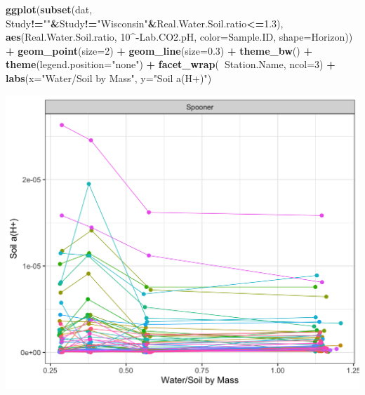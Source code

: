 \documentclass[]{article}
\newenvironment{Shaded}{\begin{snugshade}}{\end{snugshade}}
\newcommand{\DataTypeTok}[1]{\textcolor[rgb]{0.13,0.29,0.53}{#1}}
\newcommand{\DecValTok}[1]{\textcolor[rgb]{0.00,0.00,0.81}{#1}}
\newcommand{\FloatTok}[1]{\textcolor[rgb]{0.00,0.00,0.81}{#1}}
\newcommand{\KeywordTok}[1]{\textcolor[rgb]{0.13,0.29,0.53}{\textbf{#1}}}
\newcommand{\NormalTok}[1]{#1}
\newcommand{\OperatorTok}[1]{\textcolor[rgb]{0.81,0.36,0.00}{\textbf{#1}}}
\newcommand{\StringTok}[1]{\textcolor[rgb]{0.31,0.60,0.02}{#1}}
\begin{document}
\begin{Shaded}
\begin{Highlighting}[]
\KeywordTok{ggplot}\NormalTok{(}\KeywordTok{subset}\NormalTok{(dat, Study}\OperatorTok{!=}\StringTok{""}\OperatorTok{&}\NormalTok{Study}\OperatorTok{!=}\StringTok{"Wisconsin"}\OperatorTok{&}\NormalTok{Real.Water.Soil.ratio}\OperatorTok{<=}\FloatTok{1.3}\NormalTok{), }\KeywordTok{aes}\NormalTok{(Real.Water.Soil.ratio, }\DecValTok{10}\OperatorTok{^-}\NormalTok{Lab.CO2.pH, }\DataTypeTok{color=}\NormalTok{Sample.ID, }\DataTypeTok{shape=}\NormalTok{Horizon)) }\OperatorTok{+}\StringTok{ }
\StringTok{  }\KeywordTok{geom_point}\NormalTok{(}\DataTypeTok{size=}\DecValTok{2}\NormalTok{) }\OperatorTok{+}\StringTok{ }\KeywordTok{geom_line}\NormalTok{(}\DataTypeTok{size=}\FloatTok{0.3}\NormalTok{) }\OperatorTok{+}\StringTok{ }\KeywordTok{theme_bw}\NormalTok{() }\OperatorTok{+}\StringTok{ }\KeywordTok{theme}\NormalTok{(}\DataTypeTok{legend.position=}\StringTok{"none"}\NormalTok{) }\OperatorTok{+}
\StringTok{  }\KeywordTok{facet_wrap}\NormalTok{(}\OperatorTok{~}\NormalTok{Station.Name, }\DataTypeTok{ncol=}\DecValTok{3}\NormalTok{) }\OperatorTok{+}\StringTok{ }\KeywordTok{labs}\NormalTok{(}\DataTypeTok{x=}\StringTok{"Water/Soil by Mass"}\NormalTok{, }\DataTypeTok{y=}\StringTok{"Soil a(H+)"}\NormalTok{)}
\end{Highlighting}
\end{Shaded}

\includegraphics{output-rmd/jackson-plot-activity-spooner-1.png}
\end{document}
